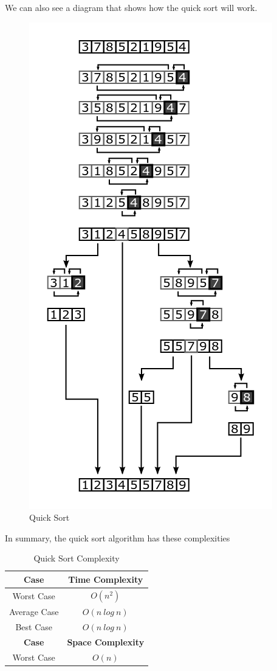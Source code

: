 \documentclass{article}
\begin{document}
We can also see a diagram that shows how the quick sort will work.

\begin{figure}[H]
  \centering
  \includegraphics[scale=0.4]{./Quicksort-diagram.png}
  \caption{Quick Sort}
  \label{fig:Quick Sort}
\end{figure}

In summary, the quick sort algorithm has these complexities

\begin{table}[H]
  \begin{center}
    \label{tab:Quick Sort Complexity}
    \begin{tabular}{c|c}
      \toprule
      \textbf{Case} & \textbf{Time Complexity} \\
      \midrule
      Worst Case & $O(n^2)$ \\
      Average Case & $O(n\ log\ n)$ \\
      Best Case & $O(n\ log\ n)$ \\
      \bottomrule
      \toprule
      \textbf{Case} & \textbf{Space Complexity} \\
      \midrule
      Worst Case & $O(n)$ \\
    \end{tabular}
    \caption{Quick Sort Complexity}
  \end{center}
\end{table}
\end{document}
